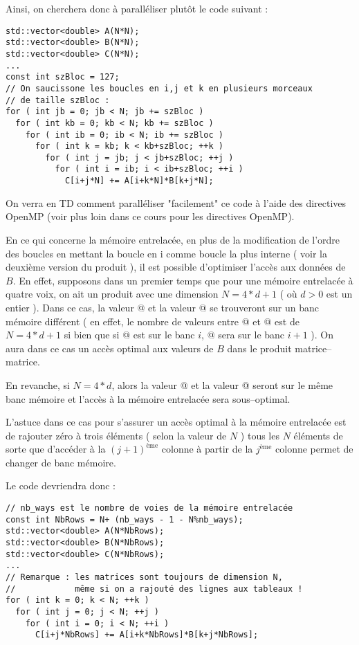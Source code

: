 \documentclass[fleqn,11pt]{article}
\begin{document}
Ainsi, on cherchera donc à paralléliser plutôt le code suivant :
\begin{lstlisting}
std::vector<double> A(N*N);
std::vector<double> B(N*N);
std::vector<double> C(N*N);
...
const int szBloc = 127;
// On saucissone les boucles en i,j et k en plusieurs morceaux 
// de taille szBloc :
for ( int jb = 0; jb < N; jb += szBloc )
  for ( int kb = 0; kb < N; kb += szBloc )
    for ( int ib = 0; ib < N; ib += szBloc )
      for ( int k = kb; k < kb+szBloc; ++k )
        for ( int j = jb; j < jb+szBloc; ++j )
          for ( int i = ib; i < ib+szBloc; ++i )
            C[i+j*N] += A[i+k*N]*B[k+j*N];
\end{lstlisting}

On verra en TD comment paralléliser "facilement" ce code à l'aide des directives OpenMP (voir plus loin dans ce cours pour les directives OpenMP).

En ce qui concerne la mémoire entrelacée, en plus de la modification de l'ordre des boucles en mettant la boucle en i comme boucle la plus interne ( voir la deuxième version du produit ), 
il est possible d'optimiser l'accès aux données de $B$. En effet, supposons dans un premier temps
que pour une mémoire entrelacée à quatre voix, on ait un produit avec une dimension $N=4*d+1$ ( où $d>0$ est un entier ).
Dans ce cas, la valeur \lstinline@B[k+j*N]@ et la valeur \lstinline@B[k+(j+1)*N]@ se trouveront sur un banc mémoire différent ( en effet, le nombre de valeurs entre  \lstinline@B[k+j*N]@ et \lstinline@B[k+(j+1)*N]@ est de $N=4*d+1$ si bien que si \lstinline@B[k+j*N]@ est sur le banc $i$, \lstinline@B[k+(j+1)*N]@ sera sur le banc $i+1$ ). On aura dans ce cas un accès optimal aux valeurs de $B$ dans le produit matrice--matrice.

En revanche, si $N=4*d$, alors la valeur \lstinline@B[k+j*N]@ et la valeur \lstinline@B[k+(j+1)*N]@ seront sur le même banc mémoire et l'accès à la mémoire entrelacée sera sous--optimal.

L'astuce dans ce cas pour s'assurer un accès optimal à la mémoire entrelacée est de rajouter zéro à trois éléments ( selon la valeur de $N$ ) tous les $N$ éléments de sorte que d'accéder à la $(j+1)^{\mbox{ème}}$ colonne à partir de la  $j^{\mbox{ème}}$ colonne permet de changer de banc mémoire.

Le code devriendra donc :
\begin{lstlisting}
// nb_ways est le nombre de voies de la mémoire entrelacée
const int NbRows = N+ (nb_ways - 1 - N%nb_ways);
std::vector<double> A(N*NbRows);
std::vector<double> B(N*NbRows);
std::vector<double> C(N*NbRows);
...
// Remarque : les matrices sont toujours de dimension N,
//            même si on a rajouté des lignes aux tableaux !
for ( int k = 0; k < N; ++k )
  for ( int j = 0; j < N; ++j )
    for ( int i = 0; i < N; ++i )
      C[i+j*NbRows] += A[i+k*NbRows]*B[k+j*NbRows];
\end{lstlisting}
\end{document}
